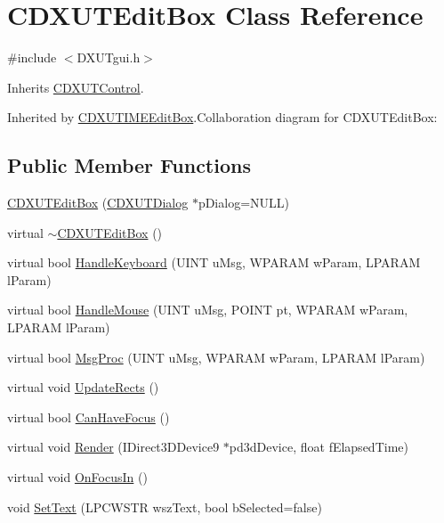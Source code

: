 \hypertarget{class_c_d_x_u_t_edit_box}{
\section{CDXUTEditBox Class Reference}
\label{class_c_d_x_u_t_edit_box}
}


{\ttfamily \#include $<$DXUTgui.h$>$}

Inherits \hyperlink{class_c_d_x_u_t_control}{CDXUTControl}.

Inherited by \hyperlink{class_c_d_x_u_t_i_m_e_edit_box}{CDXUTIMEEditBox}.Collaboration diagram for CDXUTEditBox:\subsection*{Public Member Functions}
\begin{DoxyCompactItemize}
\item 
\hyperlink{class_c_d_x_u_t_edit_box_ad2626863f3d8863dc7d4107e7282db55}{CDXUTEditBox} (\hyperlink{class_c_d_x_u_t_dialog}{CDXUTDialog} $\ast$pDialog=NULL)
\item 
virtual \hyperlink{class_c_d_x_u_t_edit_box_a49e591638b55372108780cd926b99f93}{$\sim$CDXUTEditBox} ()
\item 
virtual bool \hyperlink{class_c_d_x_u_t_edit_box_a579bcc8298d08c9d52fbf917fa046442}{HandleKeyboard} (UINT uMsg, WPARAM wParam, LPARAM lParam)
\item 
virtual bool \hyperlink{class_c_d_x_u_t_edit_box_afadff4a882c187926a7b8173eb7d97cc}{HandleMouse} (UINT uMsg, POINT pt, WPARAM wParam, LPARAM lParam)
\item 
virtual bool \hyperlink{class_c_d_x_u_t_edit_box_adca915977ba1b8019594ef5d350ed03e}{MsgProc} (UINT uMsg, WPARAM wParam, LPARAM lParam)
\item 
virtual void \hyperlink{class_c_d_x_u_t_edit_box_a86b6a5f6a509b4bc15f2edd8926718d5}{UpdateRects} ()
\item 
virtual bool \hyperlink{class_c_d_x_u_t_edit_box_a988225899327c419d70d013ed6ab113a}{CanHaveFocus} ()
\item 
virtual void \hyperlink{class_c_d_x_u_t_edit_box_af36e6dfc05fb96ee4f60544cc402e760}{Render} (IDirect3DDevice9 $\ast$pd3dDevice, float fElapsedTime)
\item 
virtual void \hyperlink{class_c_d_x_u_t_edit_box_adc767031600f1ea99ebcf533e00d7948}{OnFocusIn} ()
\item 
void \hyperlink{class_c_d_x_u_t_edit_box_a3ef3e3ef8a085258ba6bb69285505924}{SetText} (LPCWSTR wszText, bool bSelected=false)

\end{DoxyCompactItemize}
